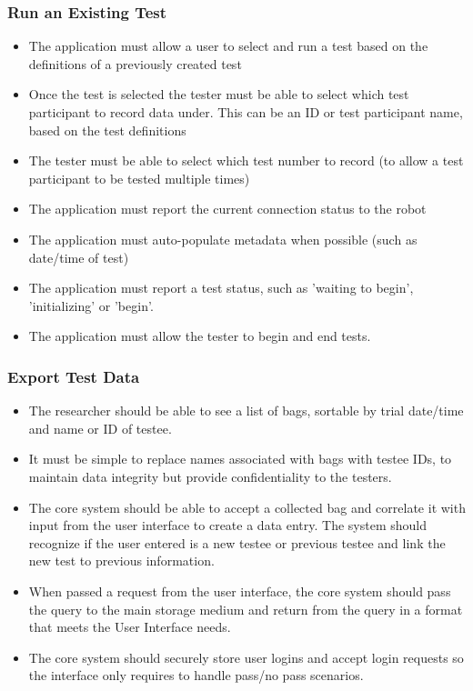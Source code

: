 \documentclass[onecolumn, draftclsnofoot,10pt, compsoc]{IEEEtran}
\begin{document}
\subsubsection{Run an Existing Test}
\begin{itemize}
	\item The application must allow a user to select and run a test based on the definitions of a previously created test
	\item Once the test is selected the tester must be able to select which test participant to record data under. This can be an ID or test participant name, based on the test definitions
	\item The tester must be able to select which test number to record (to allow a test participant to be tested multiple times)
	\item The application must report the current connection status to the robot
	\item The application must auto-populate metadata when possible (such as date/time of test)
	\item The application must report a test status, such as 'waiting to begin', 'initializing' or 'begin'.
	\item The application must allow the tester to begin and end tests.
\end{itemize}
\subsubsection{Export Test Data}
\begin{itemize}
	\item The researcher should be able to see a list of bags, sortable by trial date/time and name or ID of testee.
	\item It must be simple to replace names associated with bags with testee IDs, to maintain data integrity but provide confidentiality to the testers.
	\item The core system should be able to accept a collected bag and correlate it with input from the user interface to create a data entry.
	\subitem The system should recognize if the user entered is a new testee or previous testee and link the new test to previous information.
	\item When passed a request from the user interface, the core system should pass the query to the main storage medium and return from the query in a format that meets the User Interface needs.
	\item The core system should securely store user logins and accept login requests so the interface only requires to handle pass/no pass scenarios.
\end{itemize}
\end{document}
